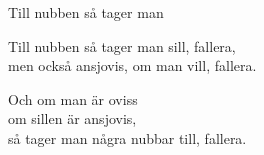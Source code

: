 \begin{song}{Till nubben så tager man}

	
	
	Till nubben så tager man sill, fallera, \\
	men också ansjovis, om man vill, fallera.\\
	\begin{repetition}
		Och om man är oviss\\
		om sillen är ansjovis,\\
		så tager man några nubbar till, fallera.
	\end{repetition}
	
\end{song}
